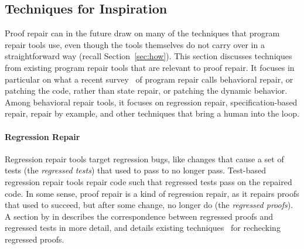 \subsection{Techniques for Inspiration}
\label{sec:techniques}


Proof repair can in the future draw on many of the techniques that program repair tools use,
even though the tools themselves do not carry over in a straightforward way (recall Section~\ref{sec:how}).
This section discusses techniques from existing program repair tools that are relevant to proof repair.
It focuses in particular on what a recent survey~\cite{Monperrus:2018:ASR:3177787.3105906} of program repair calls behavioral repair,
or patching the code, rather than state repair, or patching the dynamic behavior.
Among behavioral repair tools, it focuses on regression repair, specification-based repair,
repair by example, and other techniques that bring a human into the loop.

\paragraph{Regression Repair}
Regression repair tools target regression bugs, like changes that cause a set of tests (the \textit{regressed tests}) that used to pass to no longer pass.
Test-based regression repair tools repair code such that regressed tests pass on the repaired code.
In some sense, proof repair is a kind of regression repair, as it repairs
proofs that used to succeed, but after some change, no longer do (the \textit{regressed proofs}).
A section by  in  describes the correspondence between regressed proofs and regressed tests in more detail,
and details existing techniques~\cite{Palmskog2018, Wenzel2013MultiProcessing, Barras2013, Celik:2017:IRP:3155562.3155588, Wenzel2013, Barras2015, deMoura2015, Wenzel2014, WenzelScalingIsabelle, WenzelFurtherScalingIsabelle} for rechecking regressed proofs.

